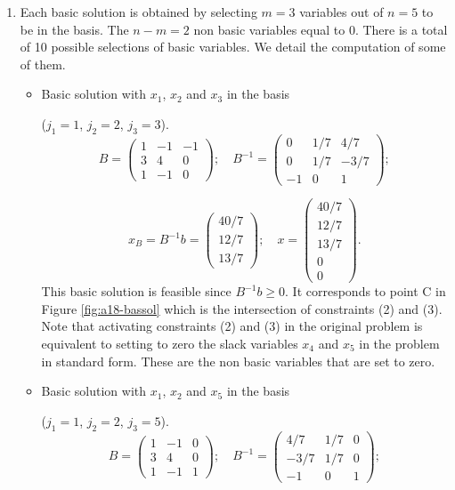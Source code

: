 \begin{enumerate}
\item  Each basic solution is obtained by selecting $m=3$ variables out of $n=5$ to be in the basis.
  The $n-m=2$ non basic variables equal to 0.
  There is a total of 10 possible selections of basic variables. We
  detail the  computation of some of them.
  \begin{itemize}
  \item Basic solution with $x_1$, $x_2$ and $x_3$ in the basis

    ($j_1=1$, $j_2=2$, $j_3=3$).
    $$B=
    \begin{pmatrix}
      1 & -1 & -1 \\
      3 & 4 & 0 \\
      1 & -1 & 0
    \end{pmatrix};
    \quad
    B^{-1}=
    \begin{pmatrix}
      0 & 1/7 & 4/7 \\
      0 & 1/7 & -3/7 \\
      -1 & 0 & 1
    \end{pmatrix};
    $$

    $$
    x_B = B^{-1}b=
    \begin{pmatrix}
      40/7  \\
      12/7 \\
      13/7
    \end{pmatrix};
    \quad
    x=
    \begin{pmatrix}
      40/7  \\
      12/7 \\
      13/7  \\
      0\\
      0
    \end{pmatrix}.
    $$
    This basic solution is feasible since $ B^{-1}b  \geq 0$. It corresponds to point C in Figure  \ref{fig:a18-bassol}
    which is the intersection of constraints (2) and (3). Note that
    activating constraints (2) and (3) in the original problem is
    equivalent to setting to zero the slack variables $x_4$ and $x_5$ in the
    problem in standard form. These are the non basic variables that
    are set to zero.


  \item Basic solution with $x_1$, $x_2$ and $x_5$ in the basis

    ($j_1=1$, $j_2=2$, $j_3=5$).
    $$B=
    \begin{pmatrix}
      1 & -1 & 0 \\
      3 & 4 & 0 \\
      1 & -1 & 1
    \end{pmatrix};
    \quad
    B^{-1}=
    \begin{pmatrix}
      4/7 & 1/7 & 0 \\
      -3/7 & 1/7 & 0 \\
      -1 & 0 & 1
    \end{pmatrix};
    $$


\end{itemize}
\end{enumerate}

